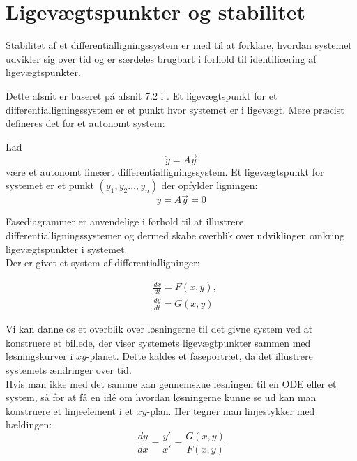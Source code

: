 \chapter{Ligevægtspunkter og stabilitet}
Stabilitet af et differentialligningssystem er med til at forklare, hvordan systemet udvikler sig over tid og er særdeles brugbart i forhold til identificering af ligevægtspunkter. 
\hfill \break

Dette afsnit er baseret på afsnit 7.2 i \citep{EP}. \hfill \break
Et ligevægtspunkt for et differentialligningssystem er et punkt hvor systemet er i ligevægt. Mere præcist defineres det for et autonomt system:
\begin{definition}[Ligevægtspunkt]
Lad 
$$\dot{y} = A\vec{y}$$
være et autonomt lineært differentialligningssystem.
Et ligevægtspunkt for systemet er et punkt $(y_1,y_2 \hdots ,y_n)$ der opfylder ligningen:
$$\dot{y} = A\vec{y}=0$$
\end{definition}

Fasediagrammer er anvendelige i forhold til at illustrere differentialligningssystemer og dermed skabe overblik over udviklingen omkring ligevægtspunkter i systemet.\\

Der er givet et system af differentialligninger:

\begin{equation}
    \begin{aligned}
    &\frac{dx}{dt}=F(x,y),\\ 
    &\frac{dy}{dt}=G(x,y)
    \end{aligned}
\end{equation}

Vi kan danne os et overblik over løsningerne til det givne system ved at konstruere et billede, der viser systemets ligevægtpunkter sammen med løsningskurver i $xy$-planet. Dette kaldes et faseportræt, da det illustrere systemets ændringer over tid. \\
\hfill \break
Hvis man ikke med det samme kan gennemskue løsningen til en ODE eller et system, så for at få en idé om hvordan løsningerne kunne se ud kan man konstruere et linjeelement i et $xy$-plan. Her tegner man linjestykker med hældingen:    
$$\frac{dy}{dx}=\frac{y'}{x'}=\frac{G(x,y)}{F(x,y)}$$

